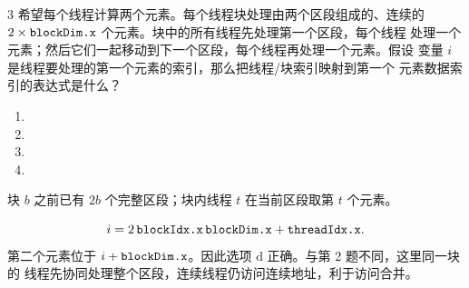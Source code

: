\begin{solutionexercise}{3}
\problemheading 希望每个线程计算两个元素。每个线程块处理由两个区段组成的、连续的
$2\times\code{blockDim.x}$ 个元素。块中的所有线程先处理第一个区段，每个线程
处理一个元素；然后它们一起移动到下一个区段，每个线程再处理一个元素。假设
变量 $i$ 是线程要处理的第一个元素的索引，那么把线程/块索引映射到第一个
元素数据索引的表达式是什么？
\begin{enumerate}[label=\alph*.,leftmargin=2.2em]
  \item {}
  \item {}
  \item {}
  \item {}
\end{enumerate}

\approachheading 块 $b$ 之前已有 $2b$ 个完整区段；块内线程 $t$ 在当前区段取第 $t$ 个元素。

\answerheading
\[
 i=2\,\code{blockIdx.x}\,\code{blockDim.x}+\code{threadIdx.x}.
\]
第二个元素位于 $i+\code{blockDim.x}$。因此选项 d 正确。与第 2 题不同，这里同一块的
线程先协同处理整个区段，连续线程仍访问连续地址，利于访问合并。


\end{solutionexercise}
